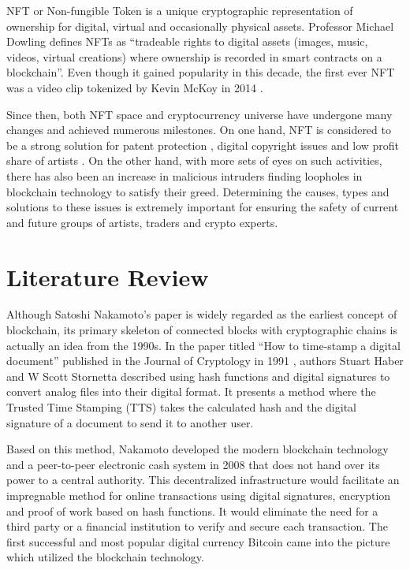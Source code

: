 \documentclass[12pt]{article}
\begin{document}
{\color{blue}
NFT or Non-fungible Token is a unique cryptographic representation of ownership for digital, virtual and occasionally physical assets. Professor Michael Dowling \cite{DOWLING2022102097} defines NFTs as “tradeable rights to digital assets (images, music, videos, virtual creations) where ownership is recorded in smart contracts on a blockchain”. Even though it gained popularity in this decade, the first ever NFT was a video clip tokenized by Kevin McKoy in 2014 \cite{9803425}.

Since then, both NFT space and cryptocurrency universe have undergone many changes and achieved numerous milestones.  On one hand, NFT is considered to be a strong solution for patent protection \cite{barakat2022use}, digital copyright issues \cite{Rafli_2022} and low profit share of artists \cite{Chainalysis}. On the other hand, with more sets of eyes on such activities, there has also been an increase in malicious intruders finding loopholes in blockchain technology to satisfy their greed. Determining the causes, types and solutions to these issues is extremely important for ensuring  the safety of current and future groups of artists, traders and crypto experts.}

\section{Literature Review}

Although Satoshi Nakamoto’s paper is widely regarded as the earliest concept of blockchain, its primary skeleton of connected blocks with cryptographic chains is actually an idea from the 1990s. In the paper titled “How to time-stamp a digital document” published in the Journal of Cryptology in 1991 \cite{modanimethodological}, authors Stuart Haber and W Scott Stornetta described using hash functions and digital signatures to convert analog files into their digital format. It presents a method where the Trusted Time Stamping (TTS) takes the calculated hash and the digital signature of a document to send it to another user. 

Based on this method, Nakamoto developed the modern blockchain technology and a peer-to-peer electronic cash system in 2008 \cite{nakamoto2008bitcoin} that does not hand over its power to a central authority. This decentralized infrastructure would facilitate an impregnable method for online transactions using digital signatures, encryption and proof of work based on hash functions. It would eliminate the need for a third party or a financial institution to verify and secure each transaction. The first successful and most popular digital currency Bitcoin came into the picture which utilized the blockchain technology. 
\end{document}
